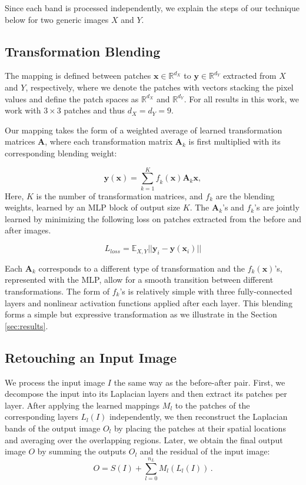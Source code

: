 Since each band is processed independently, we explain the steps of our technique below for two generic images $X$ and $Y$.


\subsection{Transformation Blending}\label{sec:Blending}

The mapping is defined between patches $\mathbf{x} \in \mathbb{R}^{d_X}$ to $\mathbf{y} \in \mathbb{R}^{d_Y}$ extracted from $X$ and $Y$, respectively, where we denote the patches with vectors stacking the pixel values and define the patch spaces as $\mathbb{R}^{d_X}$ and  $\mathbb{R}^{d_Y}$. For all results in this work, we work with $3 \times 3$ patches and thus $d_X = d_Y = 9$.

Our mapping takes the form of a weighted average of learned transformation matrices $\mathbf{A}$, where each transformation matrix $\mathbf{A}_k$ is first multiplied with its corresponding blending weight: 

\begin{equation} 
	\mathbf{y} (\mathbf{x}) = \sum_{k=1}^K
	\mathit{f}_k (\mathbf{x}) \mathbf{A}_k \mathbf{x},
	\label{eq:weightedSum}
\end{equation} 
Here, $K$ is the number of transformation matrices, and $f_k$ are the blending weights, learned by an MLP block of output size $K$. The $\mathbf{A}_k$'s and $f_k$'s are jointly learned by minimizing the following loss on patches extracted from the before and after images.

\begin{equation}
    L_{loss}  = \mathbb{E}_{X, Y} || \mathbf{y}_i -   \mathbf{y} (\mathbf{x}_i) ||
\end{equation}

Each $\mathbf{A}_k$ corresponds to a different type of transformation and the $f_k(\mathbf{x})$'s, represented with the MLP, allow for a smooth transition between different transformations. The form of $f_k$'s is relatively simple with three fully-connected layers and nonlinear activation functions applied after each layer. This blending forms a simple but expressive transformation as we illustrate in the Section \ref{sec:results}.

\subsection{Retouching an Input Image}

We process the input image $I$ the same way as the before-after pair. First, we decompose the input into its Laplacian layers and then extract its patches per layer. After applying the learned mappings $M_l$ to the patches of the corresponding layers $L_{l}(I)$ independently, we then reconstruct the Laplacian bands of the output image $O_l$ by placing the patches at their spatial locations and averaging over the overlapping regions. Later, we obtain the final output image $O$ by summing the outputs $O_l$ and the residual of the input image:
\begin{equation}
    O = S(I) + \sum_{l=0}^{n_L} M_l(L_l(I))\,.
\end{equation}
